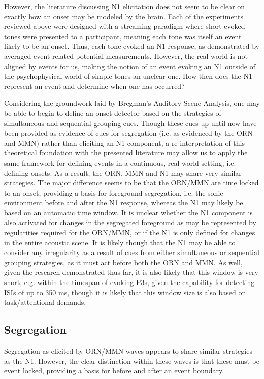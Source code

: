 \documentclass[a4paper,10pt,final]{ThesisStyle}
\begin{document}
However, the literature discussing N1 elicitation does not seem to be clear on exactly how an onset may be modeled by the brain.  Each of the experiments reviewed above were designed with a streaming paradigm where short evoked tones were presented to a participant, meaning each tone was itself an event likely to be an onset.  Thus, each tone evoked an N1 response, as demonstrated by averaged event-related potential measurements.  However, the real world is not aligned by events for us, making the notion of an event evoking an N1 outside of the psychophysical world of simple tones an unclear one.  How then does the N1 represent an event and determine when one has occurred?

Considering the groundwork laid by Bregman's Auditory Scene Analysis, one may be able to begin to define an onset detector based on the strategies of simultaneous and sequential grouping cues.  Though these cues up until now have been provided as evidence of cues for segregation (i.e. as evidenced by the ORN and MMN) rather than eliciting an N1 component, a re-interpretation of this theoretical foundation with the presented literature may allow us to apply the same framework for defining events in a continuous, real-world setting, i.e. defining onsets.  As a result, the ORN, MMN and N1 may share very similar strategies.  The major difference seems to be that the ORN/MMN are time locked to an onset, providing a basis for foreground segregation, i.e. the sonic environment before and after the N1 response, whereas the N1 may likely be based on an automatic time window.  It is unclear whether the N1 component is also activated for changes in the segregated foreground as may be represented by regularities required for the ORN/MMN, or if the N1 is only defined for changes in the entire acoustic scene.  It is likely though that the N1 may be able to consider any irregularity as a result of cues from either simultaneous or sequential grouping strategies, as it must act before both the ORN and MMN.  As well, given the research demonstrated thus far, it is also likely that this window is very short, e.g. within the timespan of evoking P3s, given the capability for detecting ISIs of up to 350 ms, though it is likely that this window size is also based on task/attentional demands.  

\subsection{Segregation}

Segregation as elicited by ORN/MMN waves appears to share similar strategies as the N1.  However, the clear distinction within these waves is that these must be event locked, providing a basis for before and after an event boundary.  
\end{document}
